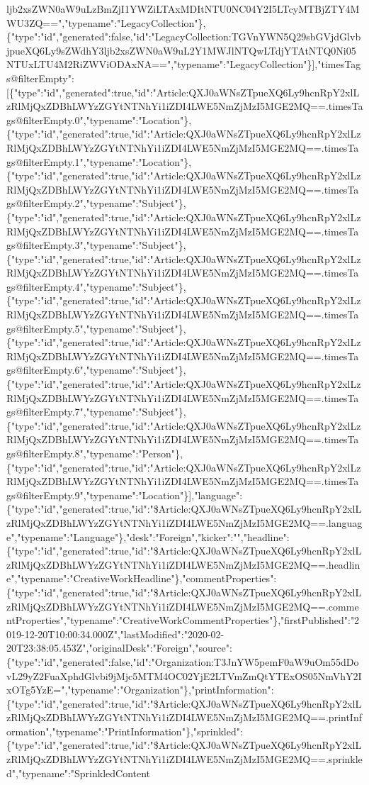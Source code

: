 ljb2xsZWN0aW9uLzBmZjI1YWZiLTAxMDItNTU0NC04Y2I5LTcyMTBjZTY4MWU3ZQ==","typename":"LegacyCollection"\},\{"type":"id","generated":false,"id":"LegacyCollection:TGVnYWN5Q29sbGVjdGlvbjpueXQ6Ly9sZWdhY3ljb2xsZWN0aW9uL2Y1MWJlNTQwLTdjYTAtNTQ0Ni05NTUxLTU4M2RiZWViODAxNA==","typename":"LegacyCollection"\}{]},"timesTags@filterEmpty":{[}\{"type":"id","generated":true,"id":"Article:QXJ0aWNsZTpueXQ6Ly9hcnRpY2xlLzRlMjQxZDBhLWYzZGYtNTNhYi1iZDI4LWE5NmZjMzI5MGE2MQ==.timesTags@filterEmpty.0","typename":"Location"\},\{"type":"id","generated":true,"id":"Article:QXJ0aWNsZTpueXQ6Ly9hcnRpY2xlLzRlMjQxZDBhLWYzZGYtNTNhYi1iZDI4LWE5NmZjMzI5MGE2MQ==.timesTags@filterEmpty.1","typename":"Location"\},\{"type":"id","generated":true,"id":"Article:QXJ0aWNsZTpueXQ6Ly9hcnRpY2xlLzRlMjQxZDBhLWYzZGYtNTNhYi1iZDI4LWE5NmZjMzI5MGE2MQ==.timesTags@filterEmpty.2","typename":"Subject"\},\{"type":"id","generated":true,"id":"Article:QXJ0aWNsZTpueXQ6Ly9hcnRpY2xlLzRlMjQxZDBhLWYzZGYtNTNhYi1iZDI4LWE5NmZjMzI5MGE2MQ==.timesTags@filterEmpty.3","typename":"Subject"\},\{"type":"id","generated":true,"id":"Article:QXJ0aWNsZTpueXQ6Ly9hcnRpY2xlLzRlMjQxZDBhLWYzZGYtNTNhYi1iZDI4LWE5NmZjMzI5MGE2MQ==.timesTags@filterEmpty.4","typename":"Subject"\},\{"type":"id","generated":true,"id":"Article:QXJ0aWNsZTpueXQ6Ly9hcnRpY2xlLzRlMjQxZDBhLWYzZGYtNTNhYi1iZDI4LWE5NmZjMzI5MGE2MQ==.timesTags@filterEmpty.5","typename":"Subject"\},\{"type":"id","generated":true,"id":"Article:QXJ0aWNsZTpueXQ6Ly9hcnRpY2xlLzRlMjQxZDBhLWYzZGYtNTNhYi1iZDI4LWE5NmZjMzI5MGE2MQ==.timesTags@filterEmpty.6","typename":"Subject"\},\{"type":"id","generated":true,"id":"Article:QXJ0aWNsZTpueXQ6Ly9hcnRpY2xlLzRlMjQxZDBhLWYzZGYtNTNhYi1iZDI4LWE5NmZjMzI5MGE2MQ==.timesTags@filterEmpty.7","typename":"Subject"\},\{"type":"id","generated":true,"id":"Article:QXJ0aWNsZTpueXQ6Ly9hcnRpY2xlLzRlMjQxZDBhLWYzZGYtNTNhYi1iZDI4LWE5NmZjMzI5MGE2MQ==.timesTags@filterEmpty.8","typename":"Person"\},\{"type":"id","generated":true,"id":"Article:QXJ0aWNsZTpueXQ6Ly9hcnRpY2xlLzRlMjQxZDBhLWYzZGYtNTNhYi1iZDI4LWE5NmZjMzI5MGE2MQ==.timesTags@filterEmpty.9","typename":"Location"\}{]},"language":\{"type":"id","generated":true,"id":"\$Article:QXJ0aWNsZTpueXQ6Ly9hcnRpY2xlLzRlMjQxZDBhLWYzZGYtNTNhYi1iZDI4LWE5NmZjMzI5MGE2MQ==.language","typename":"Language"\},"desk":"Foreign","kicker":"","headline":\{"type":"id","generated":true,"id":"\$Article:QXJ0aWNsZTpueXQ6Ly9hcnRpY2xlLzRlMjQxZDBhLWYzZGYtNTNhYi1iZDI4LWE5NmZjMzI5MGE2MQ==.headline","typename":"CreativeWorkHeadline"\},"commentProperties":\{"type":"id","generated":true,"id":"\$Article:QXJ0aWNsZTpueXQ6Ly9hcnRpY2xlLzRlMjQxZDBhLWYzZGYtNTNhYi1iZDI4LWE5NmZjMzI5MGE2MQ==.commentProperties","typename":"CreativeWorkCommentProperties"\},"firstPublished":"2019-12-20T10:00:34.000Z","lastModified":"2020-02-20T23:38:05.453Z","originalDesk":"Foreign","source":\{"type":"id","generated":false,"id":"Organization:T3JnYW5pemF0aW9uOm55dDovL29yZ2FuaXphdGlvbi9jMjc5MTM4OC02YjE2LTVmZmQtYTExOS05NmVhY2IxOTg5YzE=","typename":"Organization"\},"printInformation":\{"type":"id","generated":true,"id":"\$Article:QXJ0aWNsZTpueXQ6Ly9hcnRpY2xlLzRlMjQxZDBhLWYzZGYtNTNhYi1iZDI4LWE5NmZjMzI5MGE2MQ==.printInformation","typename":"PrintInformation"\},"sprinkled":\{"type":"id","generated":true,"id":"\$Article:QXJ0aWNsZTpueXQ6Ly9hcnRpY2xlLzRlMjQxZDBhLWYzZGYtNTNhYi1iZDI4LWE5NmZjMzI5MGE2MQ==.sprinkled","typename":"SprinkledContent